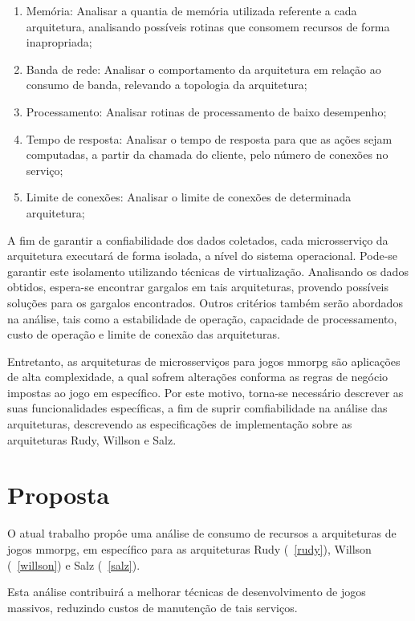 \begin{enumerate}
  \item{Memória: Analisar a quantia de memória utilizada referente a cada arquitetura, analisando possíveis rotinas que consomem recursos de forma inapropriada;}
  \item{Banda de rede: Analisar o comportamento da arquitetura em relação ao consumo de banda, relevando a topologia da arquitetura;}
  \item{Processamento: Analisar rotinas de processamento de baixo desempenho;}
  \item{Tempo de resposta: Analisar o tempo de resposta para que as ações sejam computadas, a partir da chamada do cliente, pelo número de conexões no serviço;}
  \item{Limite de conexões: Analisar o limite de conexões de determinada arquitetura;}
\end{enumerate}

A fim de garantir a confiabilidade dos dados coletados, cada microsserviço da arquitetura executará de forma isolada, a nível do sistema operacional.
%
Pode-se garantir este isolamento utilizando técnicas de virtualização.
%
Analisando os dados obtidos, espera-se encontrar gargalos em tais arquiteturas, provendo possíveis soluções para os gargalos encontrados.
%
Outros critérios também serão abordados na análise, tais como a estabilidade de operação, capacidade de processamento, custo de operação e limite de conexão das arquiteturas.
%

Entretanto, as arquiteturas de microsserviços para jogos \ac{mmorpg} são aplicações de alta complexidade, a qual sofrem alterações conforma as regras de negócio impostas ao jogo em específico.
%
Por este motivo, torna-se necessário descrever as suas funcionalidades específicas, a fim de suprir comfiabilidade na análise das arquiteturas, descrevendo as especificações de implementação sobre as arquiteturas Rudy, Willson e Salz.

\section{Proposta}

O atual trabalho propôe uma análise de consumo de recursos a arquiteturas de jogos \ac{mmorpg}, em específico para as arquiteturas Rudy (~\ref{rudy}), Willson (~\ref{willson}) e Salz (~\ref{salz}).

Esta análise contribuirá a melhorar técnicas de desenvolvimento de jogos massivos, reduzindo custos de manutenção de tais serviços.


